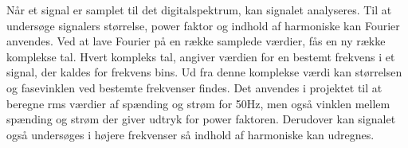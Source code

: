 Når et signal er samplet til det digitalspektrum, kan signalet analyseres. Til at undersøge signalers størrelse, power faktor og indhold af harmoniske kan Fourier anvendes. Ved at lave Fourier på en række samplede værdier, fås en ny række komplekse tal. Hvert kompleks tal, angiver værdien for en bestemt frekvens i et signal, der kaldes for frekvens bins. Ud fra denne komplekse værdi kan størrelsen og fasevinklen ved bestemte frekvenser findes. Det anvendes i projektet til at beregne rms værdier af spænding og strøm for 50Hz, men også vinklen mellem spænding og strøm der giver udtryk for power faktoren. Derudover kan signalet også undersøges i højere frekvenser så indhold af harmoniske kan udregnes.  


